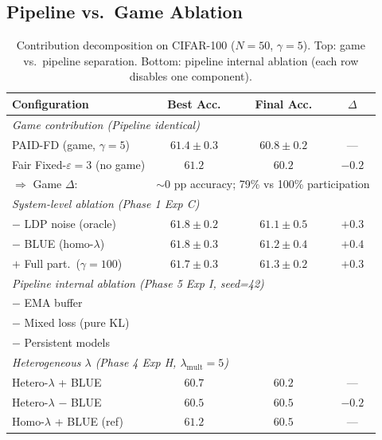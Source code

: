 \subsection{Pipeline vs.\ Game Ablation}\label{sec:pipeline_game}

\begin{table}[t]
\centering
\caption{Contribution decomposition on CIFAR-100 ($N = 50$, $\gamma = 5$).
Top: game vs.\ pipeline separation.
Bottom: pipeline internal ablation (each row disables one component).}
\label{tab:pipeline_game}
\begin{tabular}{lccc}
\toprule
\textbf{Configuration} & \textbf{Best Acc.} & \textbf{Final Acc.} & $\Delta$ \\
\midrule
\multicolumn{4}{l}{\textit{Game contribution (Pipeline identical)}} \\
PAID-FD (game, $\gamma{=}5$)    & $61.4 \pm 0.3$ & $60.8 \pm 0.2$ & ---     \\
Fair Fixed-$\varepsilon{=}3$ (no game) & $61.2$ & $60.2$ & $-0.2$  \\
\quad$\Rightarrow$ Game $\Delta$: & \multicolumn{3}{c}{$\sim$0 pp accuracy; 79\% vs 100\% participation} \\
\midrule
\multicolumn{4}{l}{\textit{System-level ablation (Phase 1 Exp C)}} \\
\quad$-$ LDP noise (oracle)     & $61.8 \pm 0.2$ & $61.1 \pm 0.5$ & $+0.3$  \\
\quad$-$ BLUE (homo-$\lambda$)  & $61.8 \pm 0.3$ & $61.2 \pm 0.4$ & $+0.4$  \\
\quad$+$ Full part.\ ($\gamma{=}100$) & $61.7 \pm 0.3$ & $61.3 \pm 0.2$ & $+0.3$ \\
\midrule
\multicolumn{4}{l}{\textit{Pipeline internal ablation (Phase 5 Exp I, seed=42)}} \\
\quad$-$ EMA buffer             & \placeholder{} & \placeholder{} & \placeholder{} \\
\quad$-$ Mixed loss (pure KL)   & \placeholder{} & \placeholder{} & \placeholder{} \\
\quad$-$ Persistent models      & \placeholder{} & \placeholder{} & \placeholder{} \\
\midrule
\multicolumn{4}{l}{\textit{Heterogeneous $\lambda$ (Phase 4 Exp H, $\lambda_\mathrm{mult}{=}5$)}} \\
\quad Hetero-$\lambda$ + BLUE   & $60.7$ & $60.2$ & ---     \\
\quad Hetero-$\lambda$ $-$ BLUE & $60.5$ & $60.5$ & $-0.2$  \\
\quad Homo-$\lambda$ + BLUE (ref) & $61.2$ & $60.5$ & ---   \\
\bottomrule
\end{tabular}
\end{table}

